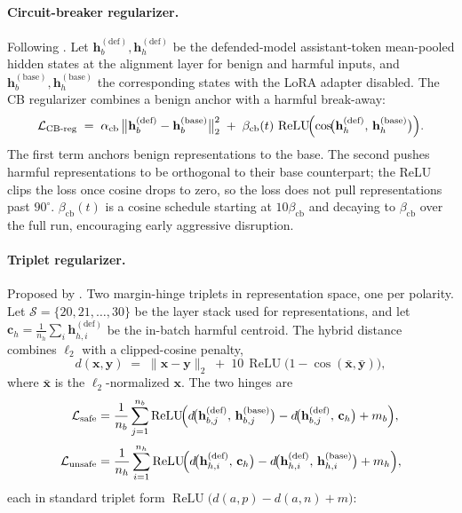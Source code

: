\paragraph{Circuit-breaker regularizer.}
Following \citet{zou2024improving}.  Let
\(\mathbf{h}^{(\text{def})}_b,\mathbf{h}^{(\text{def})}_h\) be the
defended-model assistant-token mean-pooled hidden states at the
alignment layer for benign and harmful inputs, and
\(\mathbf{h}^{(\text{base})}_b,\mathbf{h}^{(\text{base})}_h\) the
corresponding states with the LoRA adapter disabled.  The CB
regularizer combines a benign anchor with a harmful break-away:
\begin{equation}
  \mathcal{L}_\text{CB-reg}
  \;=\;
  \alpha_\text{cb}\,\bigl\lVert \mathbf{h}^{(\text{def})}_b - \mathbf{h}^{(\text{base})}_b \bigr\rVert_2^2
  \;+\;
  \beta_\text{cb}(t)\,\operatorname{ReLU}\!\Bigl(\cos\!\bigl(\mathbf{h}^{(\text{def})}_h,\,\mathbf{h}^{(\text{base})}_h\bigr)\Bigr).
  \label{eq:cb-reg}
\end{equation}
The first term anchors benign representations to the base.  The
second pushes harmful representations to be orthogonal to their base
counterpart; the ReLU clips the loss once cosine drops to zero, so
the loss does not pull representations past \(90^\circ\).
\(\beta_\text{cb}(t)\) is a cosine schedule starting at
\(10\beta_\text{cb}\) and decaying to \(\beta_\text{cb}\) over the
full run, encouraging early aggressive disruption.

\paragraph{Triplet regularizer.}
Proposed by \citet{simko2025}.  Two margin-hinge triplets in
representation space, one per polarity.  Let
\(\mathcal{S}=\{20,21,\dots,30\}\) be the layer stack used for
representations, and let \(\mathbf{c}_h = \tfrac{1}{n_h}\sum_i
\mathbf{h}^{(\text{def})}_{h,i}\) be the in-batch harmful centroid.
The hybrid distance combines \(\ell_2\) with a clipped-cosine penalty,
\begin{equation}
  d(\mathbf{x},\mathbf{y})
  \;=\;
  \lVert \mathbf{x}-\mathbf{y}\rVert_2
  \;+\;
  10\,\operatorname{ReLU}\!\bigl(1 - \cos(\bar{\mathbf{x}},\bar{\mathbf{y}})\bigr),
  \label{eq:triplet-d}
\end{equation}
where \(\bar{\mathbf{x}}\) is the \(\ell_2\)-normalized
\(\mathbf{x}\).  The two hinges are
\begin{align}
  \mathcal{L}_\text{safe}
  &= \frac{1}{n_b}\sum_{j=1}^{n_b}
     \operatorname{ReLU}\!\Bigl(
       d\!\bigl(\mathbf{h}^{(\text{def})}_{b,j},\,\mathbf{h}^{(\text{base})}_{b,j}\bigr)
       - d\!\bigl(\mathbf{h}^{(\text{def})}_{b,j},\,\mathbf{c}_h\bigr)
       + m_b
     \Bigr),
     \label{eq:triplet-safe} \\[2pt]
  \mathcal{L}_\text{unsafe}
  &= \frac{1}{n_h}\sum_{i=1}^{n_h}
     \operatorname{ReLU}\!\Bigl(
       d\!\bigl(\mathbf{h}^{(\text{def})}_{h,i},\,\mathbf{c}_h\bigr)
       - d\!\bigl(\mathbf{h}^{(\text{def})}_{h,i},\,\mathbf{h}^{(\text{base})}_{h,i}\bigr)
       + m_h
     \Bigr),
     \label{eq:triplet-unsafe}
\end{align}
each in standard triplet form
\(\operatorname{ReLU}\!\bigl(d(a,p) - d(a,n) + m\bigr)\):

